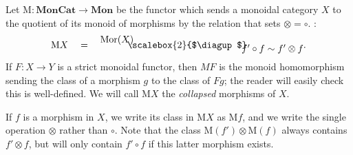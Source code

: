 \documentclass{amsbook} %
\newcommand{\mb}{\mathbf}
\newcommand{\bigquotient}[2]{ \raisebox{0.75\height}{$#1$} \mkern-12mu\scalebox{2}{$\diagup$}\mkern-10mu \raisebox{-0.5\height}{$#2$} }
\newcommand{\mon}{\ensuremath{\mb{Mon}}}
\newcommand{\moncat}{\ensuremath{\mb{MonCat}}}
\numberwithin{section}{chapter}
\begin{document}
\begin{Defi} Let $\mathrm{M} : \moncat \to \mon$ be the functor which sends a monoidal category $X$ to the quotient of its monoid of morphisms by the relation that sets $\otimes = \circ$. :
\[ \mathrm{M}X \quad = \quad \bigquotient{\mathrm{Mor}(X)}{f' \circ f \sim f' \otimes f}.\]
If $F:X \to Y$ is a strict monoidal functor, then $MF$ is the monoid homomorphism sending the class of a morphism $g$ to the class of $Fg$; the reader will easily check this is well-defined. We will call $\mathrm{M}X$ the \emph{collapsed} morphisms of $X$.


\end{Defi}

\begin{nota}
If $f$ is a morphism in $X$, we write its class in $\mathrm{M}X$ as $\mathrm{M}f$, and we write the single operation $\otimes$ rather than $\circ$. Note that the class $\mathrm{M}(f') \otimes \mathrm{M}(f)$ always contains $f' \otimes f$, but will only contain $f' \circ f$ if this latter morphism exists.
\end{nota}
\end{document}
